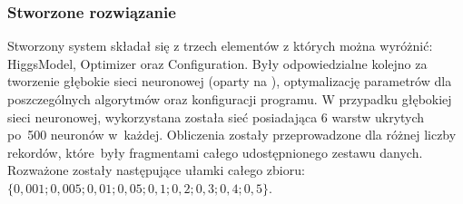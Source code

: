 \subsubsection{Stworzone rozwiązanie}
Stworzony system składał się z trzech elementów z których można wyróżnić: HiggsModel, Optimizer oraz Configuration. Były odpowiedzialne kolejno za tworzenie głębokie sieci neuronowej (oparty na \cite{higgs2}), optymalizację parametrów dla poszczególnych algorytmów oraz konfiguracji programu. W przypadku głębokiej sieci neuronowej, wykorzystana została sieć posiadająca 6 warstw ukrytych po~500 neuronów w~każdej. Obliczenia zostały przeprowadzone dla różnej liczby rekordów, które~były fragmentami całego udostępnionego zestawu danych. Rozważone zostały następujące ułamki całego zbioru: $\{0,001; 0,005; 0,01; 0,05; 0,1; 0,2; 0,3; 0,4; 0,5\}$. 


